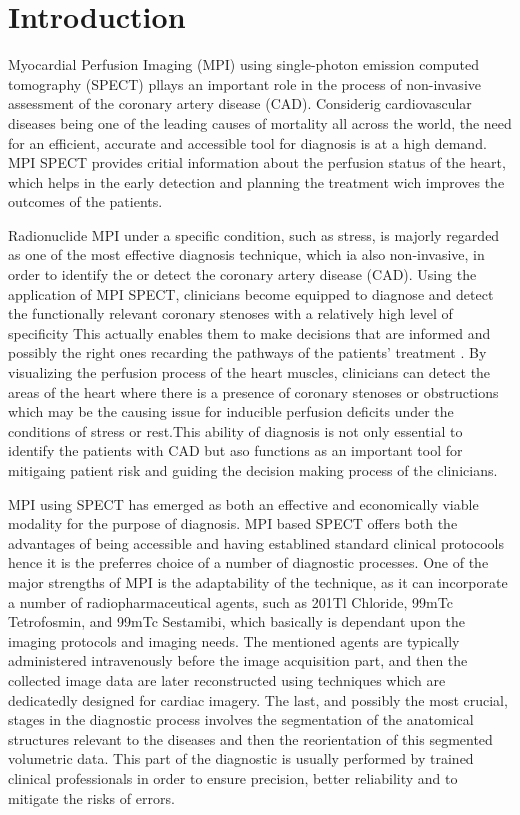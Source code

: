\chapter{Introduction}
\label{ch:intro}

Myocardial Perfusion Imaging (MPI) using single-photon emission computed tomography (SPECT) pllays an important role in the process of non-invasive assessment of the coronary artery disease (CAD). Considerig cardiovascular diseases being one of the leading causes of mortality all across the world, the need for an efficient, accurate and accessible tool for diagnosis is at a high demand. MPI SPECT provides critial information about the perfusion status of the heart, which helps in the early detection and planning the treatment wich improves the outcomes of the patients.

Radionuclide MPI under a specific condition, such as stress, is majorly regarded as one of the most effective diagnosis technique, which ia also non-invasive, in order to identify the or detect the coronary artery disease (CAD). Using the application of MPI SPECT, clinicians become equipped to diagnose and detect the functionally relevant coronary stenoses with a relatively high level of specificity This actually enables them to make decisions that are informed and possibly the right ones recarding the pathways of the patients' treatment \cite{10.1001/jamacardio.2017.2471}. By visualizing the perfusion process of the heart muscles, clinicians can detect the areas of the heart where there is a presence of coronary stenoses or obstructions which may be the causing issue for inducible perfusion deficits under the conditions of stress or rest.This ability of diagnosis is not only essential to identify the patients with CAD but aso functions as an important tool for mitigaing patient risk and guiding the decision making process of the clinicians.

MPI using SPECT has emerged as both an effective and economically viable modality for the purpose of diagnosis. MPI based SPECT offers both the advantages of being accessible and having establined standard clinical protocools hence it is the preferres choice of a number of diagnostic processes. One of the major strengths of MPI is the adaptability of the technique, as it can incorporate a number of radiopharmaceutical agents, such as 201Tl Chloride, 99mTc Tetrofosmin, and 99mTc Sestamibi, which basically is dependant upon the imaging protocols and imaging needs. The mentioned agents are typically administered intravenously before the image acquisition part, and then the collected image data are later reconstructed using techniques which are dedicatedly designed for cardiac imagery. The last, and possibly the most crucial, stages in the diagnostic process involves the segmentation of the anatomical structures relevant to the diseases and then the reorientation of this segmented volumetric data. This part of the diagnostic is usually performed by trained clinical professionals in order to ensure precision, better reliability and to mitigate the risks of errors.

